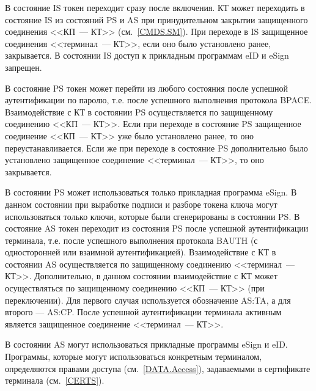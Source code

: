 В состояние IS токен переходит сразу после включения.
КТ может переходить в состояние IS из состояний PS и AS
при принудительном закрытии защищенного соединения 
<<КП~--- КТ>> (см.~\ref{CMDS.SM}).
При переходе в IS защищенное соединения <<терминал~--- КТ>>, 
если оно было установлено ранее, закрывается.
В состоянии IS доступ к прикладным программам eID и eSign запрещен.

В состояние PS токен может перейти из любого состояния 
после успешной аутентификации по паролю, 
т.е. после успешного выполнения протокола BPACE. 
Взаимодействие с КТ в состоянии PS осуществляется по 
защищенному соединению <<КП~--- КТ>>. 
Если при переходе в состояние PS защищенное соединение <<КП~--- КТ>> уже было 
установлено ранее, то оно переустанавливается. 
Если же при переходе в состояние PS дополнительно было установлено 
защищенное соединение <<терминал~--- КТ>>, то оно закрывается.

В состоянии PS может использоваться только прикладная программа eSign.
В данном состоянии при выработке подписи и разборе токена ключа
могут использоваться только ключи, которые были сгенерированы 
в состоянии PS.
В состояние AS токен переходит из состояния PS 
после успешной аутентификации терминала, т.е. 
после успешного выполнения протокола BAUTH 
(с односторонней или взаимной аутентификацией). 
Взаимодействие с КТ в состоянии AS осуществляется по 
защищенному соединению <<терминал~--- КТ>>.
Дополнительно, в данном состоянии 
взаимодействие с КТ может осуществляться 
по защищенному соединению <<КП~--- КТ>> (при переключении).
Для первого случая используется обозначение AS:TA, 
а для второго --- AS:CP. 
После успешной аутентификации терминала
активным является защищенное соединение <<терминал~--- КТ>>.


В состоянии AS могут использоваться прикладные программы eSign и eID. 
Программы, которые могут использоваться конкретным терминалом,
определяются правами доступа (см.~\ref{DATA.Access}),
задаваемыми в сертификате терминала (см.~\ref{CERTS}).

